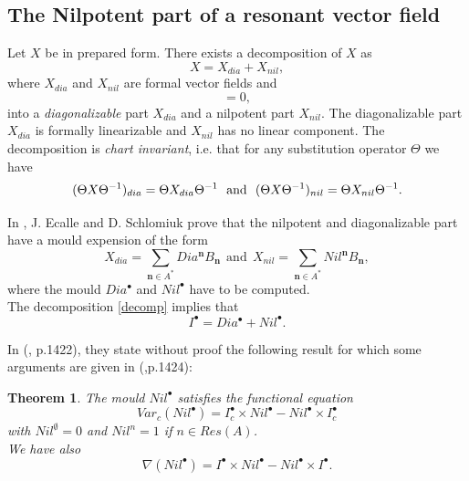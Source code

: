 \documentclass[english,11pt]{amsart}
\newtheorem{theorem}{Theorem}
\def\nn{\mathbf{n}}
\def\di{\displaystyle}
\def\nn{\mathbf{n}}
\begin{document}
\subsection{The Nilpotent part of a resonant vector field}

Let $X$ be in prepared form. There exists a decomposition of $X$ as 
\begin{equation}
\label{decomp}
    X=X_{dia} +X_{nil},
\end{equation}
where $X_{dia}$ and $X_{nil}$ are formal vector fields and 
\begin{equation}
    [X_{dia},X_{nil}]=0 ,
\end{equation}
into a {\it diagonalizable} part $X_{dia}$ and a nilpotent part $X_{nil}$. The diagonalizable part $X_{dia}$ is formally linearizable and $X_{nil}$ has no linear component. The decomposition is {\it chart invariant}, i.e. that for any substitution operator $\Theta$ we have 
\begin{equation}
    (\Theta X\Theta^{-1} )_{dia} = \Theta X_{dia} \Theta^{-1} \ \ \mbox{\rm and}\ \ (\Theta X\Theta^{-1} )_{nil} = \Theta X_{nil} \Theta^{-1} .
\end{equation}

In \cite{es}, J. Ecalle and D. Schlomiuk prove that the nilpotent and diagonalizable part have a mould expension of the form 
\begin{equation}
    X_{dia} = \di\sum_{\nn \in A^*} Dia^{\nn} B_{\nn}\ \ \mbox{and}\ \ 
    X_{nil} = \di\sum_{\nn \in A^*} Nil^{\nn} B_{\nn} ,
\end{equation}
where the mould $Dia^{\bullet}$ and $Nil^{\bullet}$ have to be computed. \\

The decomposition \eqref{decomp} implies that
\begin{equation}
    I^{\bullet} =Dia^{\bullet} +Nil^{\bullet} .
\end{equation}

In (\cite{es}, p.1422), they state without proof the following result for which some arguments are given in (\cite{es},p.1424):

\begin{theorem}\label{thm_var_nil}
    The mould $Nil^{\bullet}$ satisfies the functional equation
    \begin{equation}
    \label{varcnil}
        Var_c (Nil^{\bullet} ) =I_c^{\bullet} \times Nil^{\bullet} -Nil^{\bullet} \times I_c^{\bullet} 
    \end{equation}
    with $Nil^{\emptyset} =0$ and $Nil^{n} =1$ if $n\in Res (A)$.\\

    We have also
    \begin{equation}
        \nabla (Nil^{\bullet} ) = I^{\bullet} \times Nil^{\bullet} -Nil^{\bullet}\times I^{\bullet} .
    \end{equation}
\end{theorem}
\end{document}
